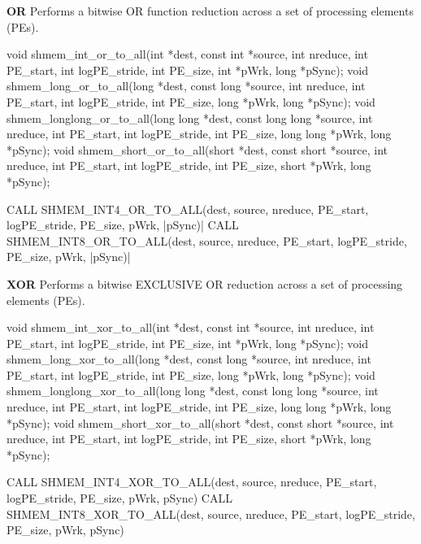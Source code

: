 \begin{apidefinition}
\bigskip
\textbf{OR} \newline
Performs  a  bitwise  OR  function reduction across a set of processing elements (\ac{PE}s).\newline
\begin{Csynopsis}
void shmem_int_or_to_all(int *dest, const int *source, int nreduce, int PE_start, int logPE_stride, int PE_size, int *pWrk, long *pSync);
void shmem_long_or_to_all(long *dest, const long *source, int nreduce, int PE_start, int logPE_stride, int PE_size, long *pWrk, long *pSync);
void shmem_longlong_or_to_all(long long *dest, const long long *source, int nreduce, int PE_start, int logPE_stride, int PE_size, long long *pWrk, long *pSync);
void shmem_short_or_to_all(short *dest, const short *source, int nreduce, int PE_start, int logPE_stride, int PE_size, short *pWrk, long *pSync);
\end{Csynopsis}

\begin{Fsynopsis}
CALL SHMEM_INT4_OR_TO_ALL(dest, source, nreduce, PE_start, logPE_stride, PE_size, pWrk, |\mbox{pSync)}|
CALL SHMEM_INT8_OR_TO_ALL(dest, source, nreduce, PE_start, logPE_stride, PE_size, pWrk, |\mbox{pSync)}|	
\end{Fsynopsis}

\bigskip
\textbf{XOR}\newline
Performs  a  bitwise  EXCLUSIVE OR reduction across a set of processing elements (\ac{PE}s).\newline
\begin{Csynopsis}
void shmem_int_xor_to_all(int *dest, const int *source, int nreduce, int PE_start, int logPE_stride, int PE_size, int *pWrk, long *pSync);
void shmem_long_xor_to_all(long *dest, const long *source, int nreduce, int PE_start, int logPE_stride, int PE_size, long *pWrk, long *pSync);
void shmem_longlong_xor_to_all(long long *dest, const long long *source, int nreduce, int PE_start, int logPE_stride, int PE_size, long long *pWrk, long *pSync);
void shmem_short_xor_to_all(short *dest, const short *source, int nreduce, int PE_start, int logPE_stride, int PE_size, short *pWrk, long *pSync);
\end{Csynopsis}

\begin{Fsynopsis}
CALL SHMEM_INT4_XOR_TO_ALL(dest, source, nreduce, PE_start, logPE_stride, PE_size, pWrk, pSync)
CALL SHMEM_INT8_XOR_TO_ALL(dest, source, nreduce, PE_start, logPE_stride, PE_size, pWrk, pSync)
\end{Fsynopsis}


\end{apidefinition}
